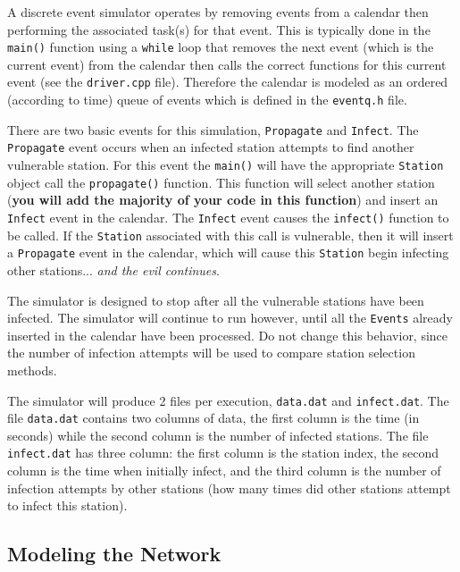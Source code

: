 \documentclass[10pt]{article}
\begin{document}
A discrete event simulator operates by removing events from a
calendar then performing the associated task(s) for that event.
This is typically done in the \texttt{main()} function using a
\texttt{while} loop that removes the next event (which is the
current event) from the calendar then calls the correct functions
for this current event (see the \texttt{driver.cpp} file).
Therefore the calendar is modeled as an ordered (according to
time) queue of events which is defined in the \texttt{eventq.h}
file.

There are two basic events for this simulation, \texttt{Propagate}
and \texttt{Infect}. The \texttt{Propagate} event occurs when an
infected station attempts to find another vulnerable station. For
this event the \texttt{main()} will have the appropriate
\texttt{Station} object call the \texttt{propagate()} function.
This function will select another station (\textbf{you will add
the majority of your code in this function}) and insert an
\texttt{Infect} event in the calendar. The \texttt{Infect} event
causes the \texttt{infect()} function to be called. If the
\texttt{Station} associated with this call is vulnerable, then it
will insert a \texttt{Propagate} event in the calendar, which will
cause this \texttt{Station} begin infecting other stations...
\textit{and the evil continues}.

The simulator is designed to stop after all the vulnerable
stations have been infected. The simulator will continue to run
however, until all the \texttt{Events} already inserted in the
calendar have been processed. Do not change this behavior, since
the number of infection attempts will be used to compare station
selection methods.


The simulator will produce 2 files per execution,
\texttt{data.dat} and \texttt{infect.dat}. The file
\texttt{data.dat} contains two columns of data, the first column
is the time (in seconds) while the second column is the number of
infected stations. The file \texttt{infect.dat} has three column:
the first column is the station index, the second column is the
time when initially infect, and the third column is the number of
infection attempts by other stations (how many times did other
stations attempt to infect this station).

\subsection*{Modeling the Network}
\end{document}
